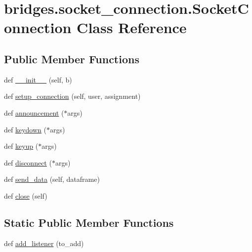 \hypertarget{classbridges_1_1socket__connection_1_1_socket_connection}{}\section{bridges.\+socket\+\_\+connection.\+Socket\+Connection Class Reference}
\label{classbridges_1_1socket__connection_1_1_socket_connection}
\subsection*{Public Member Functions}
\begin{DoxyCompactItemize}
\item 
def \mbox{\hyperlink{classbridges_1_1socket__connection_1_1_socket_connection_ae241a5233f4cb8ad07e9a716ebfa3e55}{\+\_\+\+\_\+init\+\_\+\+\_\+}} (self, b)
\item 
def \mbox{\hyperlink{classbridges_1_1socket__connection_1_1_socket_connection_a346d70ef1084f4387df0f3027ac0f527}{setup\+\_\+connection}} (self, user, assignment)
\item 
def \mbox{\hyperlink{classbridges_1_1socket__connection_1_1_socket_connection_a040d73832b206bf120d863fff73aa1db}{announcement}} ($\ast$args)
\item 
def \mbox{\hyperlink{classbridges_1_1socket__connection_1_1_socket_connection_a95e4c127da0f193bc52417e0a3eceaab}{keydown}} ($\ast$args)
\item 
def \mbox{\hyperlink{classbridges_1_1socket__connection_1_1_socket_connection_adb8a6073c93fa6d2c23a14b11a1fe774}{keyup}} ($\ast$args)
\item 
def \mbox{\hyperlink{classbridges_1_1socket__connection_1_1_socket_connection_a278e1783b3ccd658001bae5e9f1b6cb7}{disconnect}} ($\ast$args)
\item 
def \mbox{\hyperlink{classbridges_1_1socket__connection_1_1_socket_connection_a6f120b756e07aab0742ed42466984b31}{send\+\_\+data}} (self, dataframe)
\item 
def \mbox{\hyperlink{classbridges_1_1socket__connection_1_1_socket_connection_a38dd36c5ac674016d526e8cd2c515ac4}{close}} (self)
\end{DoxyCompactItemize}
\subsection*{Static Public Member Functions}
\begin{DoxyCompactItemize}
\item 
def \mbox{\hyperlink{classbridges_1_1socket__connection_1_1_socket_connection_a21d94eb97d7ea92e38dc8e78f1e40876}{add\+\_\+listener}} (to\+\_\+add)
\end{DoxyCompactItemize}
